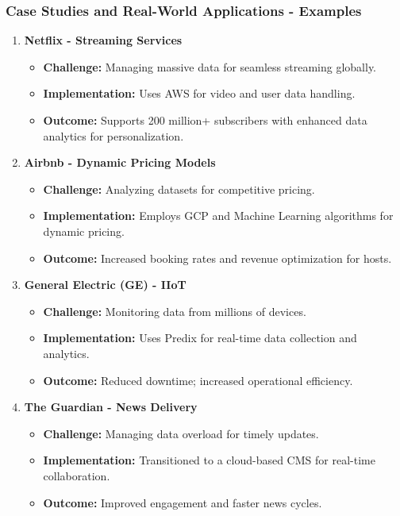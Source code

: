 \documentclass[aspectratio=169]{beamer}
\begin{document}
\begin{frame}[fragile]
    \frametitle{Case Studies and Real-World Applications - Examples}
    \begin{enumerate}
        \item \textbf{Netflix - Streaming Services}
            \begin{itemize}
                \item \textbf{Challenge:} Managing massive data for seamless streaming globally.
                \item \textbf{Implementation:} Uses AWS for video and user data handling.
                \item \textbf{Outcome:} Supports 200 million+ subscribers with enhanced data analytics for personalization.
            \end{itemize}
        
        \item \textbf{Airbnb - Dynamic Pricing Models}
            \begin{itemize}
                \item \textbf{Challenge:} Analyzing datasets for competitive pricing.
                \item \textbf{Implementation:} Employs GCP and Machine Learning algorithms for dynamic pricing.
                \item \textbf{Outcome:} Increased booking rates and revenue optimization for hosts.
            \end{itemize}
        
        \item \textbf{General Electric (GE) - IIoT}
            \begin{itemize}
                \item \textbf{Challenge:} Monitoring data from millions of devices.
                \item \textbf{Implementation:} Uses Predix for real-time data collection and analytics.
                \item \textbf{Outcome:} Reduced downtime; increased operational efficiency.
            \end{itemize}
        
        \item \textbf{The Guardian - News Delivery}
            \begin{itemize}
                \item \textbf{Challenge:} Managing data overload for timely updates.
                \item \textbf{Implementation:} Transitioned to a cloud-based CMS for real-time collaboration.
                \item \textbf{Outcome:} Improved engagement and faster news cycles.
            \end{itemize}
    \end{enumerate}
\end{frame}
\end{document}
